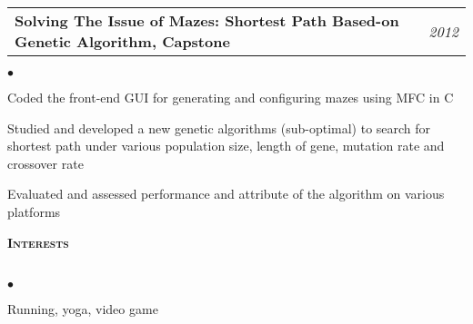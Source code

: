 \documentclass[11pt]{article}
\makeatletter
\newcommand{\lineunder}{\vspace*{-8pt} \\ \hspace*{-18pt} \hrulefill \\}
\newcommand{\header}[1]{{\hspace*{-15pt}\vspace*{6pt} \large \textsc{\textbf{#1}}} \vspace*{-6pt} \lineunder}
\newenvironment{achievements}{\begin{list}{$\bullet$}{\topsep 0pt \itemsep -2pt}}{\vspace*{4pt}\end{list}}
\newcommand{\headerrow}[2]
{\begin{tabular*}{\linewidth}{l@{\extracolsep{\fill}}r}
	\hspace*{-15pt}#1 & #2 \\
\end{tabular*}}
\newcommand{\CPP}
 {C\nolinebreak[4]\hspace{-.05em}\raisebox{.22ex}{\footnotesize\bf ++}}
\makeatother
\begin{document}
\headerrow
{\textbf{Solving The Issue of Mazes: Shortest Path Based-on Genetic Algorithm, Capstone}}
{\emph{2012}}
	\begin{achievements}
  \item Coded the front-end GUI for generating and configuring mazes using MFC in \CPP
  \item Studied and developed a new genetic algorithms (sub-optimal) to search for shortest path under various population size, length of gene,  mutation rate and crossover rate
  \item Evaluated and assessed performance and attribute of the algorithm on various platforms
  \end{achievements}

\vspace*{2.5pt}
\header{Interests}
\begin{achievements}
\item Running, yoga, video game
\end{achievements}
\end{document}
